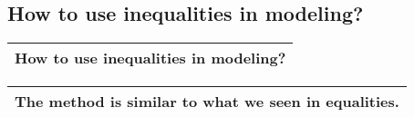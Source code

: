 \subsection{
How to use inequalities in modeling?}
\begin{small}
    \begin{tabularx}{1\textwidth}{
            p{}
        }
        \toprule
        How to use inequalities in modeling?
        \\
        \bottomrule
    \end{tabularx}
\end{small}
\begin{small}
    \begin{tabularx}{1\textwidth}{
            p{}
        }
        \toprule
        The method is similar to what we seen in equalities.
        \\
        \bottomrule
    \end{tabularx}
\end{small}
